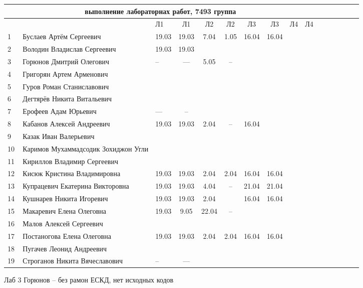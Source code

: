 \documentclass[a4paper,11pt]{article}
\begin{document}
\newpage
%
\hspace{-2.1cm} %
\begin{tabular}{l|llccccccccccccc}
\multicolumn{10}{c}{выполнение лабораторнах работ, 7493 группа} \\
\toprule
&&Л1&Л1& Л2&Л2& Л3&Л3& Л4&Л4&\\ 
\midrule
1\,&Буслаев Артём Сергеевич               &19.03&19.03& 7.04& 1.05&16.04&16.04&&\\
2\,&Володин Владислав Сергеевич           &19.03&19.03&&&&&&\\
3\,&Горюнов Дмитрий Олегович              &--   &---   & 5.05& -- &&&&\\
4\,&Григорян Артем Арменович              &&&&&&&&\\
5\,&Гуров Роман Станиславович             &&&&&&&&\\
\midrule
6\,&Дегтярёв Никита Витальевич            &&&&&&&&\\
7\,&Ерофеев Адам Юрьевич                  &---&--&&&&&&\\
8\,&Кабанов Алексей Андреевич             &19.03&19.03&2.04&--&16.04&&&\\
9\,&Казак Иван Валерьевич                 &&&&&&&&\\
10\,&Каримов Мухаммадсодик Зохиджон Угли  &&&&&&&&\\
\midrule
11\,&Кириллов Владимир Сергеевич          &&&&&&&&\\
12\,&Кисюк Кристина Владимировна          &19.03&19.03&2.04 &2.04&16.04&16.04&&\\
13\,&Купрацевич Екатерина Викторовна      &19.03&19.03& 4.04& --  &21.04&21.04&&\\
14\,&Кушнарев Никита Игоревич             &19.03&19.03& 2.04&     &16.04&16.04&&\\
15\,&Макаревич Елена Олеговна             &19.03& 9.05&22.04& --  &&&&\\
\midrule
16\,&Малов Алексей Сергеевич              &&&&&&&&\\
17\,&Постаногова Елена Олеговна           &19.03&19.03&2.04&2.04&16.04&16.04&&\\
18\,&Пугачев Леонид Андреевич             &&&&&&&&\\
19\,&Строганов Никита Вячеславович        &--&---&&&&&&\\

\bottomrule
\end{tabular}

\newpage
Лаб 3
Горюнов -- без рамон ЕСКД, нет исходных кодов
\end{document}
